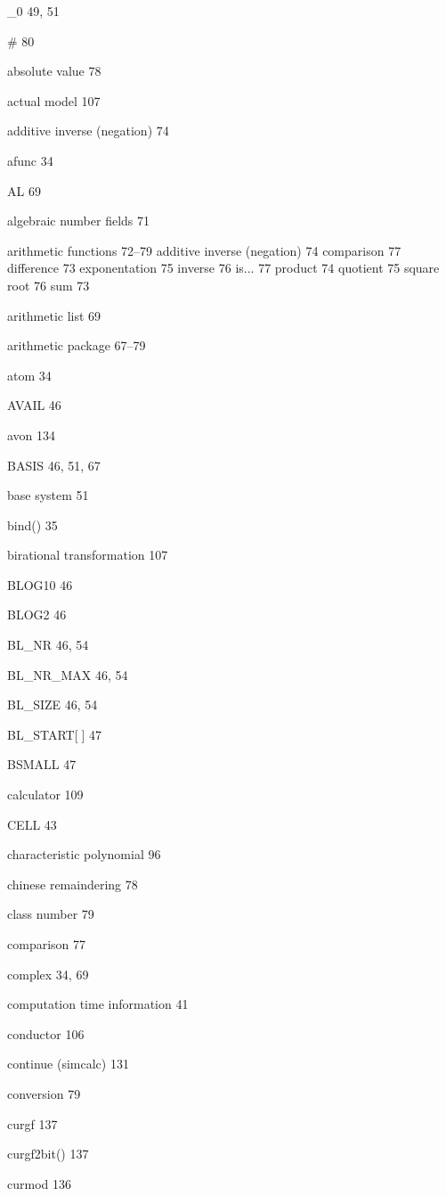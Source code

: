 \begin{theindex}

\item \_0 49, 51
\item \# 80

\indexspace

\item absolute value 78
\item actual model 107
\item additive inverse (negation) 74
\item afunc 34
\item AL 69
\item algebraic number fields 71
\item arithmetic functions 72--79
  \subitem additive inverse (negation) 74
  \subitem comparison 77
  \subitem difference 73
  \subitem exponentation 75
  \subitem inverse 76
  \subitem is... 77
  \subitem product 74 
  \subitem quotient 75
  \subitem square root 76
  \subitem sum 73
\item arithmetic list 69
\item arithmetic package 67--79
\item atom 34
\item AVAIL 46
\item avon 134

\indexspace

\item BASIS 46, 51, 67
\item base system 51
\item bind() 35
\item birational transformation 107
\item BLOG10 46
\item BLOG2 46
\item BL\_NR 46, 54
\item BL\_NR\_MAX 46, 54
\item BL\_SIZE 46, 54
\item BL\_START[$\;$] 47
\item BSMALL 47

\indexspace

\item calculator 109
\item CELL 43
\item characteristic polynomial 96
\item chinese remaindering 78
\item class number 79
\item comparison 77
\item complex 34, 69
\item computation time information 41
\item conductor 106
\item continue (simcalc) 131
\item conversion 79
\item curgf 137
\item curgf2bit() 137
\item curmod 136


\end{theindex}
